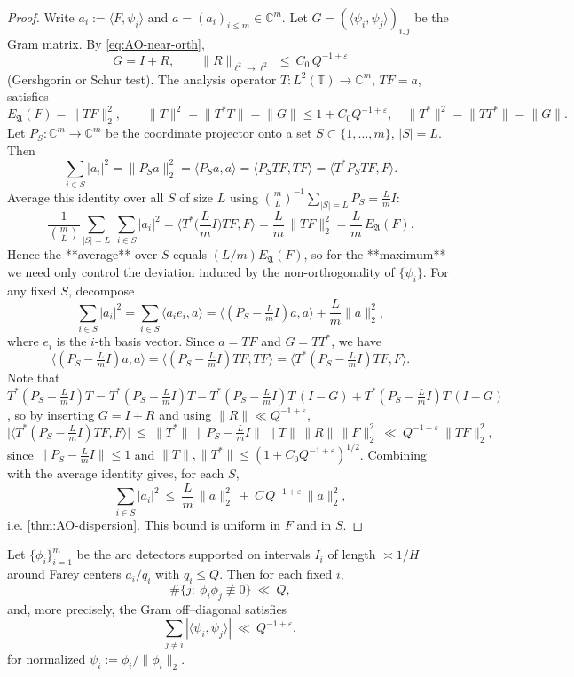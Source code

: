 \begin{proof}
Write $a_i:=\langle F,\psi_i\rangle$ and $a=(a_i)_{i\le m}\in\mathbb C^m$. 
Let $G=(\langle \psi_i,\psi_j\rangle)_{i,j}$ be the Gram matrix. By \eqref{eq:AO-near-orth},
\[
G = I + R,\qquad \|R\|_{\ell^2\to\ell^2}\ \le\ C_0\,Q^{-1+\varepsilon}
\]
(Gershgorin or Schur test). The analysis operator $T:L^2(\mathbb T)\to\mathbb C^m$, $TF=a$, satisfies
\[
E_{\mathfrak A}(F)=\|TF\|_2^2,\qquad 
\|T\|^2=\|T^\ast T\|=\|G\|\le 1+C_0Q^{-1+\varepsilon},\quad 
\|T^\ast\|^2=\|TT^\ast\|=\|G\|.
\]
Let $P_S:\mathbb C^m\to\mathbb C^m$ be the coordinate projector onto a set $S\subset\{1,\dots,m\}$, $|S|=L$. Then
\[
\sum_{i\in S}|a_i|^2=\|P_S a\|_2^2=\langle P_S a,a\rangle=\langle P_S TF,TF\rangle
=\langle T^\ast P_S T F, F\rangle.
\]
Average this identity over all $S$ of size $L$ using $\binom{m}{L}^{-1}\sum_{|S|=L}P_S=\frac{L}{m}I$:
\[
\frac{1}{\binom{m}{L}}\sum_{|S|=L}\ \sum_{i\in S}|a_i|^2
=\Big\langle T^\ast\Big(\frac{L}{m}I\Big)T F, F\Big\rangle
=\frac{L}{m}\,\|TF\|_2^2
=\frac{L}{m}\,E_{\mathfrak A}(F).
\]
Hence the **average** over $S$ equals $(L/m)E_{\mathfrak A}(F)$, so for the **maximum** we need only control the deviation induced by the non-orthogonality of $\{\psi_i\}$.
For any fixed $S$, decompose
\[
\sum_{i\in S}|a_i|^2
=\sum_{i\in S}\langle a_i e_i, a\rangle
=\langle (P_S - \tfrac{L}{m}I)a,a\rangle + \frac{L}{m}\|a\|_2^2,
\]
where $e_i$ is the $i$-th basis vector. Since $a=TF$ and $G=T T^\ast$, we have
\[
\langle (P_S - \tfrac{L}{m}I)a,a\rangle
=\langle (P_S - \tfrac{L}{m}I)TF,TF\rangle
=\langle T^\ast(P_S - \tfrac{L}{m}I)T F,F\rangle.
\]
Note that $T^\ast(P_S - \tfrac{L}{m}I)T = T^\ast(P_S - \tfrac{L}{m}I)T - T^\ast(P_S - \tfrac{L}{m}I)T\,(I-G) + T^\ast(P_S - \tfrac{L}{m}I)T\,(I-G)$, so by inserting $G=I+R$ and using $\|R\|\ll Q^{-1+\varepsilon}$,
\[
\big|\langle T^\ast(P_S - \tfrac{L}{m}I)T F,F\rangle\big|
\ \le\ \|T^\ast\|\,\|P_S - \tfrac{L}{m}I\|\,\|T\|\,\|R\|\,\|F\|_2^2
\ \ll\ Q^{-1+\varepsilon}\ \|TF\|_2^2,
\]
since $\|P_S - \tfrac{L}{m}I\|\le 1$ and $\|T\|,\|T^\ast\|\le (1+C_0Q^{-1+\varepsilon})^{1/2}$. 
Combining with the average identity gives, for each $S$,
\[
\sum_{i\in S}|a_i|^2\ \le\ \frac{L}{m}\,\|a\|_2^2\ +\ C\,Q^{-1+\varepsilon}\,\|a\|_2^2,
\]
i.e. \eqref{thm:AO-dispersion}. This bound is uniform in $F$ and in $S$.
\end{proof}

\begin{lemma}\label{lem:AO-overlap}
Let $\{\phi_i\}_{i=1}^m$ be the arc detectors supported on intervals $I_i$ of length $\asymp 1/H$ around Farey centers $a_i/q_i$ with $q_i\le Q$. Then for each fixed $i$,
\[
\#\{j:\ \phi_i\phi_j\not\equiv 0\}\ \ll\ Q,
\]
and, more precisely, the Gram off–diagonal satisfies
\[
\sum_{j\ne i} |\langle \psi_i,\psi_j\rangle|\ \ll\ Q^{-1+\varepsilon},
\]
for normalized $\psi_i:=\phi_i/\|\phi_i\|_2$.
\end{lemma}

